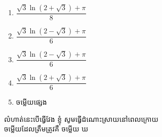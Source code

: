 \documentclass[a4paper,12pt]{article}
\begin{document}
\begin{enumerate}[m]
\begin{enumerate}[k,3]
		\item $\dfrac{\sqrt{3}\ln\left(2+\sqrt{3}\right)+\pi}{8}$
		\item $\dfrac{\sqrt{3}\ln\left(2-\sqrt{3}\right)+\pi}{6}$
		\item $\dfrac{\sqrt{3}\ln\left(2-\sqrt{3}\right)+\pi}{6}$
		\item $\dfrac{\sqrt{3}\ln\left(2+\sqrt{3}\right)+\pi}{6}$
		\item ចម្លើយផ្សេង
	\end{enumerate}
	\answer
	\begin{center}
		លំហាត់នេះបើធ្វើវែង ខ្ញុំ សូមធ្វើដំណោះស្រាយនៅពេលក្រោយ\\
		ចម្លើយដែលត្រឹមត្រូវគឺ \kml ចម្លើយ \kbk ឃ
	\end{center}
	{\color{blue}\hrulefill}

\end{enumerate}
\end{document}
